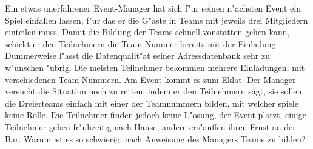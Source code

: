 Ein etwas unerfahrener Event-Manager hat sich f"ur seinen n"achsten
Event ein Spiel einfallen lassen, f"ur das er die G"aste in
Teams mit jeweils drei Mitgliedern einteilen muss. 
Damit die Bildung der Teams schnell vonstatten gehen kann, schickt
er den Teilnehmern die Team-Nummer bereits mit der Einladung.
Dummerweise l"asst die Datenqualit"at seiner Adressdatenbank
sehr zu w"unschen "ubrig. Die meisten Teilnehmer bekommen mehrere
Einladungen, mit verschiedenen Team-Nummern. Am Event kommt es zum Eklat.
Der Manager versucht die Situation noch zu retten, indem er den
Teilnehmern sagt, sie sollen die Dreierteams einfach mit einer
der Teamnummern bilden, mit welcher spiele keine Rolle. Die Teilnehmer
finden jedoch keine L"osung, der Event platzt, einige Teilnehmer 
gehen fr"uhzeitig nach Hause, andere ers"auffen ihren Frust an der Bar.
Warum ist es so schwierig, nach Anweisung des Managers Teams zu bilden?

